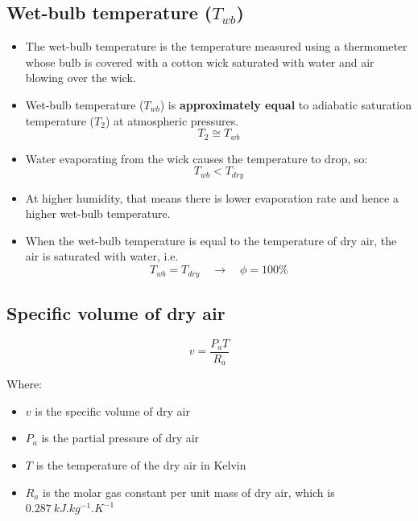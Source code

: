 \documentclass[11pt]{article}
\begin{document}
\subsection{Wet-bulb temperature (\(T_{wb}\))}
\label{sec:org90f14ab}
\begin{itemize}
\item The wet-bulb temperature is the temperature measured using a thermometer whose bulb is covered with a cotton wick saturated with water and air blowing over the wick.
\item Wet-bulb temperature (\(T_{wb}\)) is \textbf{approximately equal} to adiabatic saturation temperature (\(T_2\)) at atmospheric pressures.
\[T_2 \cong T_{wb}\]
\item Water evaporating from the wick causes the temperature to drop, so:
\[T_{wb} < T_{dry}\]
\item At higher humidity, that means there is lower evaporation rate and hence a higher wet-bulb temperature.
\item When the wet-bulb temperature is equal to the temperature of dry air, the air is saturated with water, i.e.
\[T_{wb} = T_{dry} \quad \rightarrow \quad \phi = 100\%\]
\end{itemize}

\subsection{Specific volume of dry air}
\label{sec:org3db63f7}
\[v = \frac{P_a T}{R_a}\]

Where:
\begin{itemize}
\item \(v\) is the specific volume of dry air
\item \(P_a\) is the partial pressure of dry air
\item \(T\) is the temperature of the dry air in Kelvin
\item \(R_{a}\) is the molar gas constant per unit mass of dry air, which is \(\qty{0.287}{kJ.kg^{-1}.K^{-1}}\)
\end{itemize}

 \newpage
\end{document}
